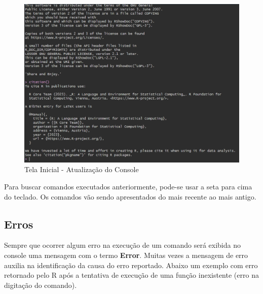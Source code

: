 \documentclass[
  letterpaper,
  DIV=11,
  numbers=noendperiod]{scrreprt}
\begin{document}
\begin{figure}

{\centering \includegraphics{./images/r/intro/tela_inicial_atualizacao_console.png}

}

\caption{\label{fig-r-intro-tela-inicial-atualizacao-console}Tela
Inicial - Atualização do Console}

\end{figure}

\begin{tcolorbox}[enhanced jigsaw, bottomtitle=1mm, colframe=quarto-callout-tip-color-frame, coltitle=black, left=2mm, opacitybacktitle=0.6, opacityback=0, breakable, arc=.35mm, titlerule=0mm, title=\textcolor{quarto-callout-tip-color}{\faLightbulb}\hspace{0.5em}{Buscando Comandos Anteriores}, colbacktitle=quarto-callout-tip-color!10!white, toptitle=1mm, leftrule=.75mm, bottomrule=.15mm, toprule=.15mm, colback=white, rightrule=.15mm]

Para buscar comandos executados anteriormente, pode-se usar a seta para
cima do teclado. Os comandos vão sendo apresentados do mais recente ao
mais antigo.

\end{tcolorbox}

\hypertarget{erros}{%
\subsection{Erros}\label{erros}}

Sempre que ocorrer algum erro na execução de um comando será exibida no
console uma mensagem com o termo \textbf{Error}. Muitas vezes a mensagem
de erro auxilia na identificação da causa do erro reportado. Abaixo um
exemplo com erro retornado pelo R após a tentativa de execução de uma
função inexistente (erro na digitação do comando).
\end{document}
